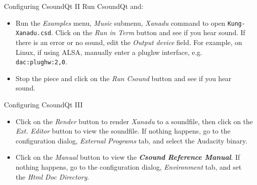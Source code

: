 \documentclass{beamer}
\begin{document}
    \begin{frame}{Configuring CsoundQt II}
        Run CsoundQt and:
        \begin{itemize}
            \item Run the \textit{Examples} menu, \textit{Music} submenu,
            \textit{Xanadu} command to open \texttt{Kung-Xanadu.csd}. Click on the
            \textit{Run in Term} button and see if you hear sound. If there is an error or
            no sound, edit the \textit{Output device} field. For example, on Linux, if using
            ALSA, manually enter a plughw interface, e.g. \texttt{dac:plughw:2,0}.
            \item Stop the piece and click on the \textit{Run Csound} button and see
            if you hear sound.
        \end{itemize}
    \end{frame}
    \begin{frame}{Configuring CsoundQt III}
        \begin{itemize}
            \item Click on the \textit{Render} button to render \textit{Xanadu} to a
            soundfile, then click on the \textit{Ext. Editor} button to view the soundfile.
            If nothing happens, go to the configuration dialog, \textit{External Programs}
            tab, and select the Audacity binary.
            \item Click on the \textit{Manual} button to view the
            \textit{\textbf{Csound Reference Manual}}. If nothing happens, go to the
            configuration dialog, \textit{Environment} tab, and set the \textit{Html Doc
                Directory}.
        \end{itemize}
    \end{frame}
    
\end{document}
